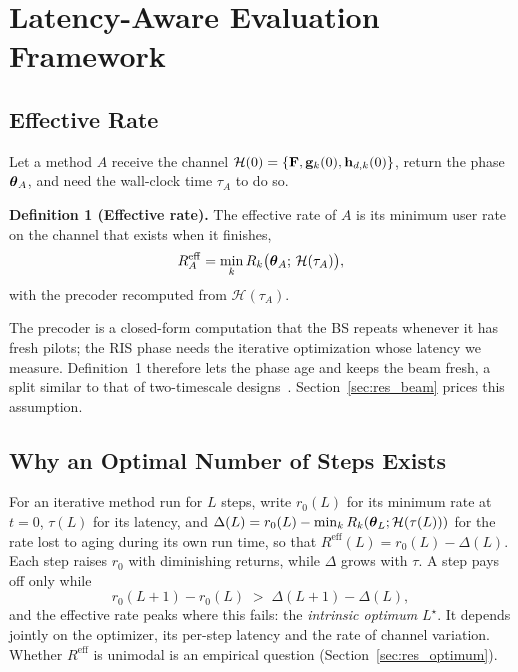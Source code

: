 \section{Latency-Aware Evaluation Framework}
\label{sec:framework}

\subsection{Effective Rate}
Let a method $A$ receive the channel $\mathcal{H}(0)=\{\mathbf{F},\mathbf{g}_k(0),\mathbf{h}_{d,k}(0)\}$, return the phase $\boldsymbol{\theta}_A$, and need the wall-clock time $\tau_A$ to do so.

\textbf{Definition 1 (Effective rate).} The effective rate of $A$ is its minimum user rate on the channel that exists when it finishes,
\begin{equation}
    R^{\mathrm{eff}}_A = \min_k R_k\big(\boldsymbol{\theta}_A;\,\mathcal{H}(\tau_A)\big),
    \label{eq:effective_rate}
\end{equation}
with the precoder recomputed from $\mathcal{H}(\tau_A)$.

The precoder is a closed-form computation that the BS repeats whenever it has fresh pilots; the RIS phase needs the iterative optimization whose latency we measure. Definition~1 therefore lets the phase age and keeps the beam fresh, a split similar to that of two-timescale designs~\cite{Zhao2021TWC}. Section~\ref{sec:res_beam} prices this assumption.

\subsection{Why an Optimal Number of Steps Exists}
For an iterative method run for $L$ steps, write $r_0(L)$ for its minimum rate at $t=0$, $\tau(L)$ for its latency, and $\Delta(L)=r_0(L)-\min_k R_k(\boldsymbol{\theta}_L;\mathcal{H}(\tau(L)))$ for the rate lost to aging during its own run time, so that $R^{\mathrm{eff}}(L)=r_0(L)-\Delta(L)$. Each step raises $r_0$ with diminishing returns, while $\Delta$ grows with $\tau$. A step pays off only while
\begin{equation}
    r_0(L+1)-r_0(L) \;>\; \Delta(L+1)-\Delta(L),
    \label{eq:marginal}
\end{equation}
and the effective rate peaks where this fails: the \emph{intrinsic optimum} $L^\star$. It depends jointly on the optimizer, its per-step latency and the rate of channel variation. Whether $R^{\mathrm{eff}}$ is unimodal is an empirical question (Section~\ref{sec:res_optimum}).

